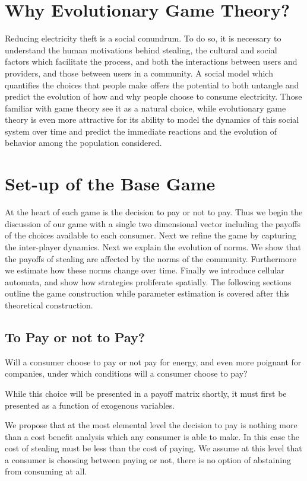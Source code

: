 \documentclass{article}
\begin{document}
\section{Why Evolutionary Game Theory?}
Reducing electricity theft is a social conundrum. To do so, it is necessary to understand the human motivations behind stealing, the cultural and social factors which facilitate the process, and both the interactions between users and providers, and those between users in a community. A social model which quantifies the choices that people make offers the potential to both untangle and predict the evolution of how and why people choose to consume electricity. Those familiar with game theory see it as a natural choice, while evolutionary game theory is even more attractive for its ability to model the dynamics of this social system over time and predict the immediate reactions and the evolution of behavior among the population considered. 


\section{Set-up of the Base Game}
At the heart of each game is the decision to pay or not to pay. Thus we begin the discussion of our game with a single two dimensional vector including the payoffs of the choices available to each consumer. Next we refine the game by capturing the inter-player dynamics. Next we explain the evolution of norms. We show that the payoffs of stealing are affected by the norms of the community. Furthermore we estimate how these norms change over time. Finally we introduce cellular automata, and show how strategies proliferate spatially. The following sections outline the game construction while parameter estimation is covered after this theoretical construction. \\ 

\subsection{To Pay or not to Pay?}
Will a consumer choose to pay or not pay for energy, and even more poignant for companies, under which conditions will a consumer choose to pay?

While this choice will be presented in a payoff matrix shortly, it must first be presented as a function of exogenous variables.

We propose that at the most elemental level the decision to pay is nothing more than a cost benefit analysis which any consumer is able to make. In this case the cost of stealing must be less than the cost of paying. We assume at this level that a consumer is choosing between paying or not, there is no option of abstaining from consuming at all.
\end{document}
